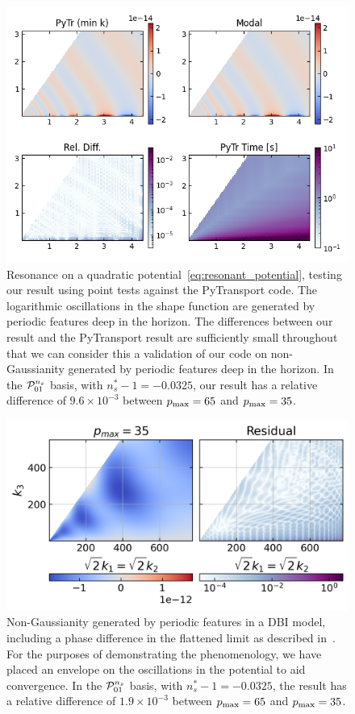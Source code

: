 \begin{figure}[!pth]
\centering
\includegraphics[width=0.99\columnwidth]{plots/slice_min_100.png}
\caption{
    Resonance on a quadratic potential~\eqref{eq:resonant_potential},
    testing our result using point tests against the
    PyTransport code.
    The logarithmic oscillations in the shape function are generated by periodic
    features deep in the horizon.
    The differences between our result and the PyTransport result
    are sufficiently small throughout that we can consider this
    a validation of our code on non-Gaussianity generated by periodic
    features deep in the horizon.
    In the $\mathcal{P}^{n_s}_{01}$ basis, with $n_s^{*}-1 = -0.0325$,
    our result has a relative difference of $9.6\times10^{-3}$
    between $p_\text{max}=65$ and $p_\text{max}=35$.
}\label{pytr_comparison_min}
\end{figure}

\begin{figure}[!pth]
\centering
\includegraphics[width=0.99\columnwidth]{plots/tetra_slice_dbi_reso_bump_hq_coolwarm.png}
\caption{
    Non-Gaussianity generated by periodic
    features in a DBI model, including a phase difference
    in the flattened limit as described in~\cite{chen_folded_resonant}.
    For the purposes of demonstrating the phenomenology,
    we have placed an envelope on the oscillations in the potential
    to aid convergence.
    In the $\mathcal{P}^{n_s}_{01}$ basis, with $n_s^{*}-1 = -0.0325$,
    the result has a relative difference of $1.9\times10^{-3}$
    between $p_\text{max}=65$ and $p_\text{max}=35$.
}\label{slice_plot_dbi_reso}
\end{figure}
\newpage
